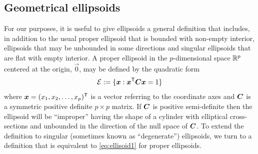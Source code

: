 \subsection{Geometrical ellipsoids}
For our purposes, it is useful to give ellipsoids a general definition that includes, in addition to the usual proper ellipsoid that is bounded with non-empty interior,  ellipsoids that may be unbounded in some directions and singular ellipsoids that are flat with empty interior.
%
%
%
A proper ellipsoid in the $p$-dimensional space $\mathbb{R}^{p}$
centered at the origin, $\vec{0}$,
may be defined by the quadratic form
\begin{equation}\label{eq:ellisoid1}
\mathcal{E} := \{ \bm{x}: \bm{x}^\mathsf{T} \bm{C} \bm{x} =1 \}
\end{equation}
where $\bm{x} = (x_1, x_2, \dots , x_p)^\mathsf{T}$ is a vector referring to the coordinate axes and $\bm{C}$ is a symmetric 
positive definite $p \times p$ matrix. 
If $\bm{C}$ is positive semi-definite then the ellipsoid will be ``improper'' having the shape of a cylinder with elliptical cross-sections and unbounded in the direction of the null space of $\bm{C}$.
To extend the definition to singular (sometimes known as ``degenerate'') ellipsoids, we turn to a definition that is equivalent to \eqref{eq:ellisoid1} for proper ellipsoids.   
